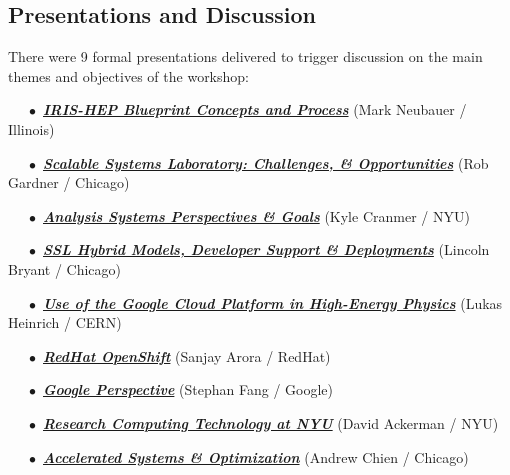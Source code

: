 \documentclass[11pt,letterpaper,fleqn]{article}
\begin{document}
\subsection{Presentations and Discussion}
\vspace{0.2cm}
There were 9 formal presentations delivered to trigger discussion on the main themes and objectives of the workshop:

\vspace{0.2cm}

\noindent~~~$\bullet$~\href{https://indico.cern.ch/event/820946/contributions/3461588/attachments/1866577/3069573/IRIS-HEP_BluePrint_AS_SSL.pdf}{\textbf{\textit{IRIS-HEP Blueprint Concepts and Process}}} (Mark Neubauer / Illinois)

\noindent~~~$\bullet$~\href{https://indico.cern.ch/event/820946/contributions/3461590/attachments/1866979/3070394/2019.06.21_SSL_Overview_Rob.pdf}{\textbf{\textit{Scalable Systems Laboratory: Challenges, \& Opportunities}}} (Rob Gardner / Chicago)

\noindent~~~$\bullet$~\href{https://indico.cern.ch/event/820946/contributions/3461589/attachments/1867063/3070546/AS-SSL-Blueprint.pdf}{\textbf{\textit{Analysis Systems Perspectives \& Goals}}} (Kyle Cranmer / NYU)

\noindent~~~$\bullet$~\href{https://indico.cern.ch/event/820946/contributions/3461592/attachments/1866998/3119402/2019.06.21_SSL_Patterns__Deployments_Lincoln.pdf}{\textbf{\textit{SSL Hybrid Models, Developer Support \& Deployments}}} (Lincoln Bryant / Chicago)

\noindent~~~$\bullet$~\href{https://indico.cern.ch/event/820946/contributions/3461593/attachments/1867157/3070768/go}{\textbf{\textit{Use of the Google Cloud Platform in High-Energy Physics}}} (Lukas Heinrich / CERN)

\noindent~~~$\bullet$~\href{https://indico.cern.ch/event/820946/contributions/3461594/attachments/1867161/3070777/OpenShift_4.pdf}{\textbf{\textit{RedHat OpenShift}}} (Sanjay Arora / RedHat)

\noindent~~~$\bullet$~\href{https://indico.cern.ch/event/820946/contributions/3461593/attachments/1867157/3070794/go}{\textbf{\textit{Google Perspective}}} (Stephan Fang / Google)

\noindent~~~$\bullet$~\href{https://indico.cern.ch/event/820946/contributions/3461596/attachments/1867159/3070772/go}{\textbf{\textit{Research Computing Technology at NYU}}} (David Ackerman / NYU)

\noindent~~~$\bullet$~\href{https://indico.cern.ch/event/820946/contributions/3464565/attachments/1867166/3070786/IRIS-HEP-Accelerated-Scalability-6-21-2019-v2.pdf}{\textbf{\textit{Accelerated Systems \& Optimization}}} (Andrew Chien / Chicago) \\
\end{document}
